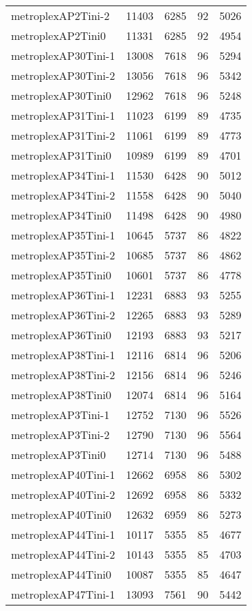 \begin{longtable}{lrrrr}
metroplexAP2Tini-2 & 11403 & 6285 & 92 & 5026 \\
metroplexAP2Tini0 & 11331 & 6285 & 92 & 4954 \\
metroplexAP30Tini-1 & 13008 & 7618 & 96 & 5294 \\
metroplexAP30Tini-2 & 13056 & 7618 & 96 & 5342 \\
metroplexAP30Tini0 & 12962 & 7618 & 96 & 5248 \\
metroplexAP31Tini-1 & 11023 & 6199 & 89 & 4735 \\
metroplexAP31Tini-2 & 11061 & 6199 & 89 & 4773 \\
metroplexAP31Tini0 & 10989 & 6199 & 89 & 4701 \\
metroplexAP34Tini-1 & 11530 & 6428 & 90 & 5012 \\
metroplexAP34Tini-2 & 11558 & 6428 & 90 & 5040 \\
metroplexAP34Tini0 & 11498 & 6428 & 90 & 4980 \\
metroplexAP35Tini-1 & 10645 & 5737 & 86 & 4822 \\
metroplexAP35Tini-2 & 10685 & 5737 & 86 & 4862 \\
metroplexAP35Tini0 & 10601 & 5737 & 86 & 4778 \\
metroplexAP36Tini-1 & 12231 & 6883 & 93 & 5255 \\
metroplexAP36Tini-2 & 12265 & 6883 & 93 & 5289 \\
metroplexAP36Tini0 & 12193 & 6883 & 93 & 5217 \\
metroplexAP38Tini-1 & 12116 & 6814 & 96 & 5206 \\
metroplexAP38Tini-2 & 12156 & 6814 & 96 & 5246 \\
metroplexAP38Tini0 & 12074 & 6814 & 96 & 5164 \\
metroplexAP3Tini-1 & 12752 & 7130 & 96 & 5526 \\
metroplexAP3Tini-2 & 12790 & 7130 & 96 & 5564 \\
metroplexAP3Tini0 & 12714 & 7130 & 96 & 5488 \\
metroplexAP40Tini-1 & 12662 & 6958 & 86 & 5302 \\
metroplexAP40Tini-2 & 12692 & 6958 & 86 & 5332 \\
metroplexAP40Tini0 & 12632 & 6959 & 86 & 5273 \\
metroplexAP44Tini-1 & 10117 & 5355 & 85 & 4677 \\
metroplexAP44Tini-2 & 10143 & 5355 & 85 & 4703 \\
metroplexAP44Tini0 & 10087 & 5355 & 85 & 4647 \\
metroplexAP47Tini-1 & 13093 & 7561 & 90 & 5442 \\

\end{longtable}
